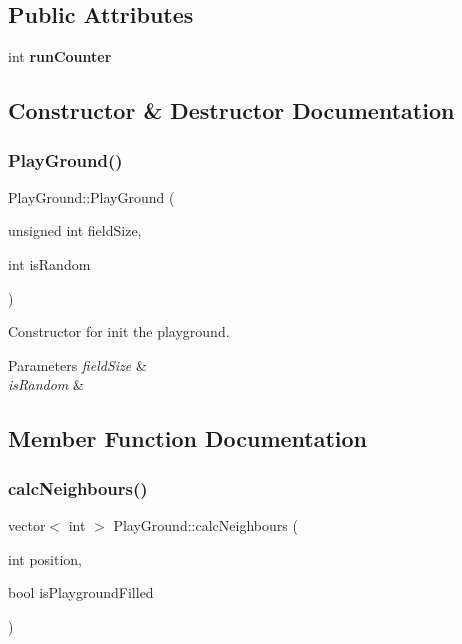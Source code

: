 \subsection*{Public Attributes}
\begin{DoxyCompactItemize}
\item 
\mbox{\label{class_play_ground_aa5b4367596442cbdaf8c2947d7dfd82d}} 
int {\bfseries run\+Counter}
\end{DoxyCompactItemize}


\subsection{Constructor \& Destructor Documentation}
\mbox{\label{class_play_ground_ae6968b32015b5d0a0c60ca95f9f48271}} 
\subsubsection{\texorpdfstring{Play\+Ground()}{PlayGround()}}
{\footnotesize\ttfamily Play\+Ground\+::\+Play\+Ground (\begin{DoxyParamCaption}\item[{unsigned int}]{field\+Size,  }\item[{int}]{is\+Random }\end{DoxyParamCaption})}

Constructor for init the playground. 
\begin{DoxyParams}{Parameters}
{\em field\+Size} & \\
\hline
{\em is\+Random} & \\
\hline
\end{DoxyParams}


\subsection{Member Function Documentation}
\mbox{\label{class_play_ground_aafba04cef3f1fb053b64dba6b613ed59}} 
\subsubsection{\texorpdfstring{calc\+Neighbours()}{calcNeighbours()}}
{\footnotesize\ttfamily vector$<$ int $>$ Play\+Ground\+::calc\+Neighbours (\begin{DoxyParamCaption}\item[{int}]{position,  }\item[{bool}]{is\+Playground\+Filled }\end{DoxyParamCaption})}

